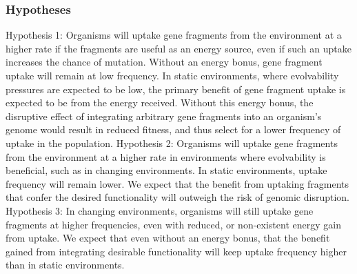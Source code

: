 \subsubsection{Hypotheses}

Hypothesis 1: Organisms will uptake gene fragments from the environment at a higher rate if the fragments are useful as an energy source, even if such an uptake increases the chance of mutation. 
Without an energy bonus, gene fragment uptake will remain at low frequency. In static environments, where evolvability pressures are expected to be low, the primary benefit of gene fragment uptake is expected to be from the energy received. Without this energy bonus, the disruptive effect of integrating arbitrary gene fragments into an organism’s genome would result in reduced fitness, and thus select for a lower frequency of uptake in the population.
Hypothesis 2: Organisms will uptake gene fragments from the environment at a higher rate in environments where evolvability is beneficial, such as in changing environments. In static environments, uptake frequency will remain lower. We expect that the benefit from uptaking fragments that confer the desired functionality will outweigh the risk of genomic disruption.
Hypothesis 3: In changing environments, organisms will still uptake gene fragments at higher frequencies, even with reduced, or non-existent energy gain from uptake. We expect that even without an energy bonus, that the benefit gained from integrating desirable functionality will keep uptake frequency higher than in static environments.